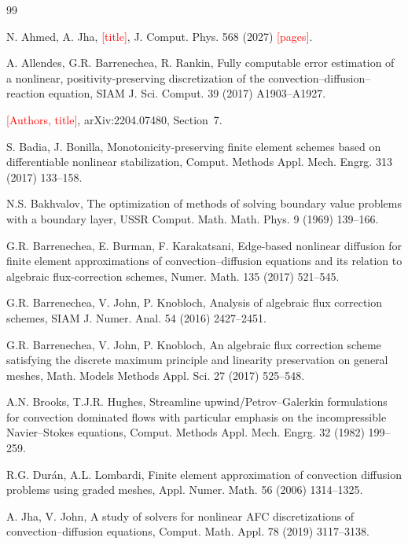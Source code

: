 \documentclass[11pt,a4paper]{article}
\newcommand{\todo}[1]{\textcolor{red}{[#1]}}
\theoremstyle{remark}
\begin{document}
\begin{thebibliography}{99}

 N. Ahmed, A. Jha, \todo{title}, J. Comput. Phys. 568 (2027) \todo{pages}.

 A. Allendes, G.R. Barrenechea, R. Rankin, Fully computable error estimation of a nonlinear,
positivity-preserving discretization of the convection--diffusion--reaction equation, SIAM J. Sci. Comput. 39 (2017)
A1903--A1927.

 \todo{Authors, title}, arXiv:2204.07480, Section~7.

 S. Badia, J. Bonilla, Monotonicity-preserving finite element schemes based on differentiable nonlinear
stabilization, Comput. Methods Appl. Mech. Engrg. 313 (2017) 133--158.

 N.S. Bakhvalov, The optimization of methods of solving boundary value problems with a boundary layer,
USSR Comput. Math. Math. Phys. 9 (1969) 139--166.

 G.R. Barrenechea, E. Burman, F. Karakatsani, Edge-based nonlinear diffusion for finite element
approximations of convection--diffusion equations and its relation to algebraic flux-correction schemes, Numer. Math.
135 (2017) 521--545.

 G.R. Barrenechea, V. John, P. Knobloch, Analysis of algebraic flux correction schemes, SIAM J. Numer.
Anal. 54 (2016) 2427--2451.

 G.R. Barrenechea, V. John, P. Knobloch, An algebraic flux correction scheme satisfying the discrete
maximum principle and linearity preservation on general meshes, Math. Models Methods Appl. Sci. 27 (2017) 525--548.

 A.N. Brooks, T.J.R. Hughes, Streamline upwind/Petrov--Galerkin formulations for convection dominated
flows with particular emphasis on the incompressible Navier--Stokes equations, Comput. Methods Appl. Mech. Engrg. 32
(1982) 199--259.

 R.G. Dur\'an, A.L. Lombardi, Finite element approximation of convection diffusion problems using
graded meshes, Appl. Numer. Math. 56 (2006) 1314--1325.

 A. Jha, V. John, A study of solvers for nonlinear AFC discretizations of convection--diffusion equations,
Comput. Math. Appl. 78 (2019) 3117--3138.


\end{thebibliography}
\end{document}
